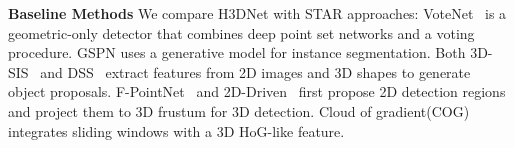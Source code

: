 \noindent \textbf{Baseline Methods} We compare H3DNet with STAR approaches: VoteNet~\cite{qi2019votenet} is a geometric-only detector that combines deep point set networks and a voting procedure. GSPN\cite{yi2019gspn} uses a generative model for instance segmentation. Both 3D-SIS~\cite{Hou_2019_CVPR_3D-SIS} and DSS~\cite{Song_2016_CVPR} extract features from 2D images and 3D shapes to generate object proposals. F-PointNet~\cite{qi2018frustum} and 2D-Driven~\cite{Lahoud_2017_ICCV} first propose 2D detection regions and project them to 3D frustum for 3D detection. Cloud of gradient(COG)~\cite{Ren_2016_CVPR} integrates sliding windows with a 3D HoG-like feature. 











